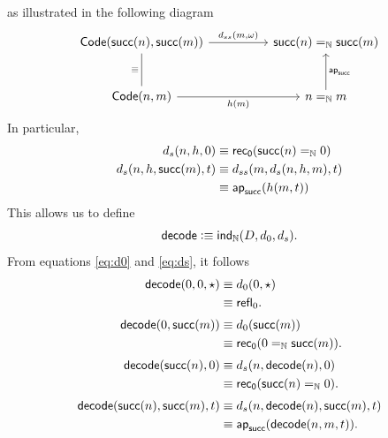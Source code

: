 \begin{description}[font=\normalfont\scshape]
    as illustrated in the following diagram
    \[
        \begin{tikzcd}[column sep=huge,row sep=large]
            {\fun{Code}(\fun{succ}(n),\fun{succ}(m))}
                    \arrow[r,"{d_{ss}(m,\omega)}"]
                &\fun{succ}(n)\eq\N\fun{succ}(m)\\
            {\fun{Code}(n,m)}
                    \arrow[r,"h(m)"']
                    \arrow[u,"\equiv",no head]
                &n\eq\N m
                    \arrow[u,"\fun{ap}_{\fun{succ}}"']
        \end{tikzcd}
    \]
    In particular,
    \begin{equation}\label{eq:ds}
        \begin{aligned}
            d_s(n,h,0)
                &\equiv\mathsf{rec}_{\mathsf{0}}(\mathsf{succ}(n)\mathrel{=_{\mathbb{N}}}0)\\
            d_s(n,h,\mathsf{succ}(m),t)
                &\equiv d_{ss}(m,d_s(n,h,m),t)\\
                &\equiv\mathsf{ap}_{\mathsf{succ}}(h(m,t))
        \end{aligned}
    \end{equation}
    This allows us to define
    \[
        \mathsf{decode}\mathrel{\vcentcolon}\equiv\mathsf{ind}_{\mathbb{N}}(D,d_0,d_s).
    \]
    From equations \eqref{eq:d0} and \eqref{eq:ds}, it follows
    \begin{equation}\label{eq:decode}
        \begin{aligned}
            \mathsf{decode}(0,0,\mathsf{\star})
                &\equiv d_0(0,\mathsf{\star})\\
                &\equiv\mathsf{refl}_0.\\[1mm]
            \mathsf{decode}(0,\mathsf{succ}(m))
                &\equiv d_0(\mathsf{succ}(m))\\
                &\equiv\mathsf{rec}_{\mathsf{0}}(0\mathrel{=_{\mathbb{N}}}\mathsf{succ}(m)).\\[1mm]
            \mathsf{decode}(\mathsf{succ}(n),0)
                &\equiv d_s(n,\mathsf{decode}(n),0)\\
                &\equiv\mathsf{rec}_{\mathsf{0}}(\mathsf{succ}(n)\mathrel{=_{\mathbb{N}}}0).\\[1mm]
            \mathsf{decode}(\mathsf{succ}(n),\mathsf{succ}(m),t)
                &\equiv d_s(n,\mathsf{decode}(n),\mathsf{succ}(m),t)\\
                &\equiv\mathsf{ap}_{\mathsf{succ}}(\mathsf{decode}(n,m,t)).
        \end{aligned}
    \end{equation}
\end{description}

